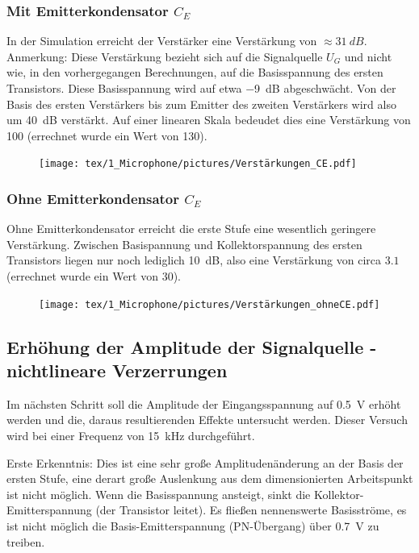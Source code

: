 \subsubsection{Mit Emitterkondensator $C_E$}

In der Simulation erreicht der Verstärker eine Verstärkung von $\approx \SI{31}{dB}$. Anmerkung: Diese Verstärkung bezieht sich auf die Signalquelle $U_G$ und nicht wie, in den vorhergegangen Berechnungen, auf die Basisspannung des ersten Transistors. Diese Basisspannung wird auf etwa \SI{-9}{dB} abgeschwächt. Von der Basis des ersten Verstärkers bis zum Emitter des zweiten Verstärkers wird also um \SI{40}{dB} verstärkt.
Auf einer linearen Skala bedeudet dies eine Verstärkung von 100 (errechnet wurde ein Wert von 130).

\begin{figure}[H]
    \centering
    \texttt{[image: tex/1\_Microphone/pictures/Verstärkungen\_CE.pdf]}
    \label{fig:my_label}
\end{figure}

\subsubsection{Ohne Emitterkondensator $C_E$}

Ohne Emitterkondensator erreicht die erste Stufe eine wesentlich geringere Verstärkung. Zwischen Basispannung und Kollektorspannung des ersten Transistors liegen nur noch lediglich \SI{10}{dB}, also eine Verstärkung von circa $3.1$ (errechnet wurde ein Wert von 30). 

\begin{figure}[H]
    \centering
    \texttt{[image: tex/1\_Microphone/pictures/Verstärkungen\_ohneCE.pdf]}
    \label{fig:my_label}
\end{figure}

\subsection{Erhöhung der Amplitude der Signalquelle - nichtlineare Verzerrungen}

Im nächsten Schritt soll die Amplitude der Eingangsspannung auf \SI{0.5}{\volt} erhöht werden und die, daraus resultierenden Effekte untersucht werden. Dieser Versuch wird bei einer Frequenz von \SI{15}{\kilo \hertz} durchgeführt.

Erste Erkenntnis: Dies ist eine sehr große Amplitudenänderung an der Basis der ersten Stufe, eine derart große Auslenkung aus dem dimensionierten Arbeitspunkt ist nicht möglich. Wenn die Basisspannung ansteigt, sinkt die Kollektor-Emitterspannung (der Transistor leitet). Es fließen nennenswerte Basisströme, es ist nicht möglich die Basis-Emitterspannung (PN-Übergang) über \SI{0.7}{\volt} zu treiben.

